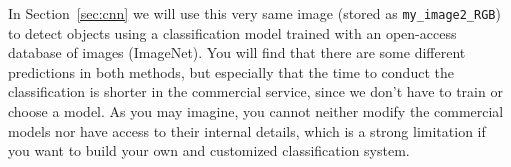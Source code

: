 In Section~\ref{sec:cnn} we will use this very same image (stored as \texttt{my\_image2\_RGB}) to detect objects using a classification model trained with an open-access database of images (ImageNet). You will find that there are some different predictions in both methods, but especially that the time to conduct the classification is shorter in the commercial service, since we don't have to train or choose a model. As you may imagine, you cannot neither modify the commercial models nor have access to their internal details, which is a strong limitation if you want to build your own and customized classification system.